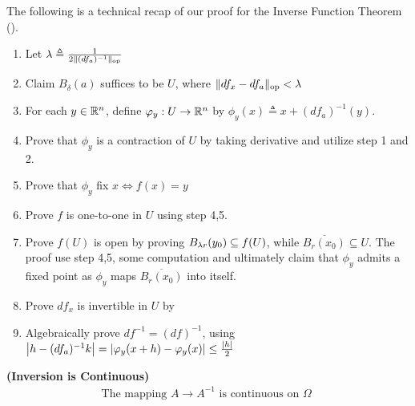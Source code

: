 \documentclass{report}
\begin{document}
\begin{mdframed}
The following is a technical recap of our proof for the Inverse Function Theorem (). 
\begin{enumerate}[label=\arabic*:]
  \item Let $\lambda \triangleq \frac{1}{2 \| (df_a)^{-1} \|_{\text{op}}}$ 
  \item Claim $B_\delta(a)$ suffices to be $U$, where $\| df_x-df_a \|_\text{op}<\lambda $ 
  \item For each $y\in\mathbb{R}^n$, define $\varphi_y:U\rightarrow \mathbb{R}^n$ by $\phi_y(x)\triangleq x+(df_a)^{-1}(y)$. 
  \item Prove that $\phi_y$ is a contraction of $U$ by taking derivative and utilize step 1 and 2.
  \item Prove that $\phi_y$ fix $x\iff f(x)=y$ 
  \item Prove $f$ is one-to-one in $U$ using step 4,5.
  \item Prove $f(U)$ is open by proving $B_{\lambda r}(y_0)\subseteq f(U)$, while $\overline{B_r(x_0)}\subseteq U$. The proof use step 4,5, some computation and ultimately claim that $\phi_y$ admits a fixed point as $\phi_y$ maps $\overline{B_r(x_0)}$ into itself. 
  \item Prove $df_x$ is invertible in $U$ by 
  \item Algebraically prove $df^{-1}=(df)^{-1}$, using $\left|h-(df_a)^{-1}k\right|=\left|\varphi_y (x+h)-\varphi_y (x)\right|\leq \frac{\left|h\right|}{2}$
\end{enumerate}
\end{mdframed}
\begin{theorem}
\textbf{(Inversion is Continuous)} 
\begin{align*}
\text{ The mapping }A \to A^{-1}\text{ is continuous on $\Omega$ }
\end{align*}
\end{theorem}
\end{document}
